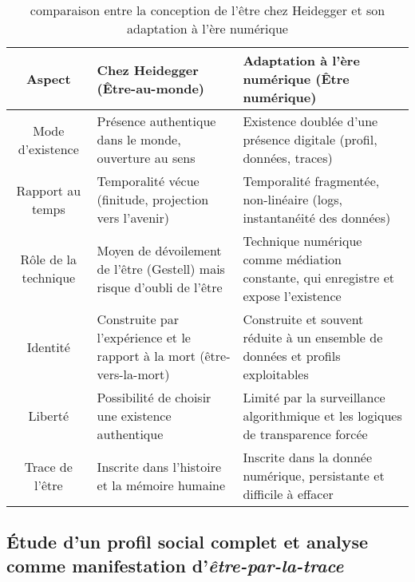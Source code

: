 \documentclass[12pt,a4paper]{article}
\begin{document}
	\begin{table}[h]
		\centering
		\begin{tabular}{|c|p{6cm}|p{7cm}|}
			\hline
			\textbf{Aspect }& \textbf{Chez Heidegger (Être-au-monde)} & \textbf{Adaptation à l’ère numérique (Être numérique)} \\
			\hline
			Mode d’existence & Présence authentique dans le monde, ouverture au sens & Existence doublée d’une présence digitale (profil, données, traces) \\
			\hline
			Rapport au temps &  Temporalité vécue (finitude, projection vers l’avenir) & Temporalité fragmentée, non-linéaire (logs, instantanéité des données) \\
			\hline
			Rôle de la technique & Moyen de dévoilement de l’être (Gestell) mais risque d’oubli de l’être & Technique numérique comme médiation constante, qui enregistre et expose l’existence \\
			\hline
			Identité & Construite par l’expérience et le rapport à la mort (être-vers-la-mort) & Construite et souvent réduite à un ensemble de données et profils exploitables \\
			\hline
			Liberté & Possibilité de choisir une existence authentique & Limité par la surveillance algorithmique et les logiques de transparence forcée \\
			\hline
			Trace de l’être &  Inscrite dans l’histoire et la mémoire humaine & Inscrite dans la donnée numérique, persistante et difficile à effacer\\
			\hline
		\end{tabular}
		\caption{comparaison entre la conception de l’être chez Heidegger et son adaptation à l’ère numérique}
	\end{table}
	\subsection{Étude d'un profil social complet et analyse comme manifestation d'\emph{être-par-la-trace} }
\end{document}
